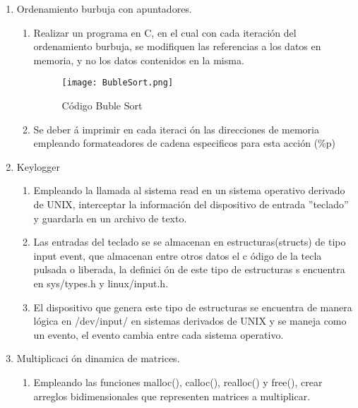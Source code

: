\documentclass[a4paperx]{article}
\begin{document}
\begin{enumerate}

\item{Ordenamiento burbuja con apuntadores.}

\begin{enumerate}
\item{Realizar un programa en C, en el cual con cada iteraci\'on del ordenamiento burbuja, se modifiquen las referencias a los datos en memoria, y no los datos contenidos en la misma.}

\begin{figure}[H]
\centering
\texttt{[image: BubleSort.png]}
\caption{C\'odigo Buble Sort}
\end{figure}

\item{Se deber \'a imprimir en cada iteraci \'on las direcciones de memoria empleando formateadores de cadena especificos para esta acci\'on (\%p)}
\end{enumerate}

\item{Keylogger}

\begin{enumerate}
\item{Empleando la llamada al sistema read en un sistema operativo derivado
de UNIX, interceptar la informaci\'on del dispositivo de entrada $”$teclado$”$
y guardarla en un archivo de texto.}

\item{Las entradas del teclado se se almacenan en estructuras(structs) de
tipo input event, que almacenan entre otros datos el c \'odigo de la
tecla pulsada o liberada, la definici \'on de este tipo de estructuras s
encuentra en sys/types.h y linux/input.h.}

\item{El dispositivo que genera este tipo de estructuras se encuentra de
manera l\'ogica en /dev/input/ en sistemas derivados de UNIX y se
maneja como un evento, el evento cambia entre cada sistema operativo.}
\end{enumerate}


\item{Multiplicaci \'on dinamica de matrices.}\\

\begin{enumerate}

\item{Empleando las funciones malloc(), calloc(), realloc() y free(), crear
arreglos bidimensionales que representen matrices a multiplicar.}\\


\end{enumerate}
\end{enumerate}
\end{document}
